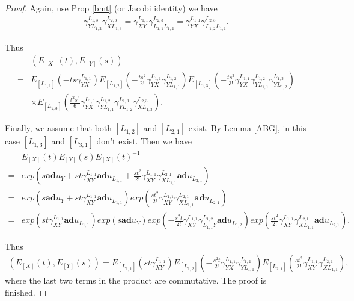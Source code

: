 \documentclass[12pt]{amsart}
\begin{document}
\begin{proof}
    Again, use Prop \ref{bmt} (or Jacobi identity) we have 
    \begin{align*}
        \gamma_{YL_{1,2}}^{L_{1,3}} \gamma_{XL_{1,3}}^{L_{2,3}} = \gamma_{XY}^{L_{1,1}} \gamma_{L_{1,1}L_{1,2}}^{L_{2,3}} = \gamma_{YX}^{L_{1,1}} \gamma_{L_{1,2}L_{1,1}}^{L_{2,3}} .
    \end{align*}
    
    Thus
    \begin{align*}
        & (E_{[X]}(t),E_{[Y]}(s)) \\
       =&  E_{[L_{1,1}]}(-ts\gamma_{YX}^{L_{1,1}}) E_{[L_{1,2}]}(-\frac{ts^2}{2!}\gamma_{YX}^{L_{1,1}}\gamma_{YL_{1,1}}^{L_{1,2}}) E_{[L_{1,3}]}( - \frac{ts^3}{3!}\gamma_{YX}^{L_{1,1}}\gamma_{YL_{1,1}}^{L_{1,2}}\gamma_{YL_{1,2}}^{L_{1,3}}) \\
        & \times  E_{[L_{2,3}]}(\frac{t^2 s^3}{6} \gamma_{YX}^{L_{1,1}} \gamma_{YL_{1,1}}^{L_{1,2}} \gamma_{YL_{1,2}}^{L_{1,3}} \gamma_{XL_{1,3}}^{L_{2,3}}   ).
    \end{align*}




Finally, we assume that both $[L_{1,2}]$ and $[L_{2,1}]$ exist.
By Lemma \ref{ABG}, in this case $[L_{1,3}]$ and $[L_{3,1}]$ don't exist.
Then we have
    \begin{align*}
      &  E_{[X]}(t) E_{[Y]}(s) E_{[X]}(t)^{-1} \\
    = & exp(s\mathbf{ad}u_Y + st\gamma_{XY}^{L_{1,1}}\mathbf{ad}u_{L_{1,1}} + \frac{st^2}{2!}\gamma_{XY}^{L_{1,1}}\gamma_{XL_{1,1}}^{L_{2,1}}\mathbf{ad}u_{L_{2,1}} ) \\
    = & exp(s\mathbf{ad}u_Y + st\gamma_{XY}^{L_{1,1}}\mathbf{ad}u_{L_{1,1}}) exp( \frac{st^2}{2!}\gamma_{XY}^{L_{1,1}}\gamma_{XL_{1,1}}^{L_{2,1}}\mathbf{ad}u_{L_{2,1}} ) \\
    = & exp(st\gamma_{XY}^{L_{1,1}}\mathbf{ad}u_{L_{1,1}}) exp(s\mathbf{ad}u_Y) exp(-\frac{s^2 t}{2!} \gamma_{XY}^{L_{1,1}} \gamma_{L_{1,1}Y}^{L_{1,2}} \mathbf{ad} u_{L_{1,2}} )exp( \frac{st^2}{2!}\gamma_{XY}^{L_{1,1}}\gamma_{XL_{1,1}}^{L_{2,1}}\mathbf{ad}u_{L_{2,1}} ) .
    \end{align*}

    Thus
    \begin{align*}
        (E_{[X]}(t),E_{[Y]}(s)) = E_{[L_{1,1}]}(st\gamma_{XY}^{L_{1,1}}) E_{[L_{1,2}]}(-\frac{s^2 t}{2!} \gamma_{YX}^{L_{1,1}} \gamma_{YL_{1,1}}^{L_{1,2}}) E_{[L_{2,1}]}(\frac{st^2}{2!}\gamma_{XY}^{L_{1,1}}\gamma_{XL_{1,1}}^{L_{2,1}}),
    \end{align*}
    where the last two terms in the product are commutative.
   The proof is finished.
\end{proof}
\end{document}
